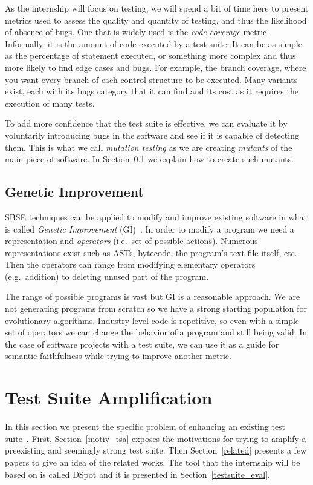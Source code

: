 \documentclass[11pt]{sdm}
\newcommand{\dspot}{DSpot\xspace}
\begin{document}
As the internship will focus on testing, we will spend a bit of time here to present metrics used to assess the quality and quantity of testing, and thus the likelihood of absence of bugs.
One that is widely used is the \textit{code coverage} metric.
Informally, it is the amount of code executed by a test suite.
It can be as simple as the percentage of statement executed, or something more complex and thus more likely to find edge cases and bugs.
For example, the branch coverage, where you want every branch of each control structure to be executed.
Many variants exist, each with its bugs category that it can find and its cost as it requires the execution of many tests.

To add more confidence that the test suite is effective, we can evaluate it by voluntarily introducing bugs in the software and see if it is capable of detecting them.
This is what we call \textit{mutation testing} as we are creating \textit{mutants} of the main piece of software.
In Section~\ref{applications} we explain how to create such mutants.

\subsection{Genetic Improvement}
\label{applications}
SBSE techniques can be applied to modify and improve existing software in what is called \textit{Genetic Improvement} (GI)~\cite{petke2017genetic}.
In order to modify a program we need a representation and \textit{operators} (i.e.\ set of possible actions).
Numerous representations exist such as ASTs, bytecode, the program's text file itself, etc.
Then the operators can range from modifying elementary operators (e.g.\ addition) to deleting unused part of the program.

The range of possible programs is vast but GI is a reasonable approach.
We are not generating programs from scratch so we have a strong starting population for evolutionary algorithms.
Industry-level code is repetitive, so even with a simple set of operators we can change the behavior of a program and still being valid.
In the case of software projects with a test suite, we can use it as a guide for semantic faithfulness while trying to improve another metric.


\section{Test Suite Amplification}
\label{tsa}
In this section we present the specific problem of enhancing an existing test suite~\cite{danglot2017emerging}.
First, Section~\ref{motiv_tsa} exposes the motivations for trying to amplify a preexisting and seemingly strong test suite.
Then Section~\ref{related} presents a few papers to give an idea of the related works.
The tool that the internship will be based on is called \dspot{} and it is presented in Section~\ref{testsuite_eval}.
\end{document}
